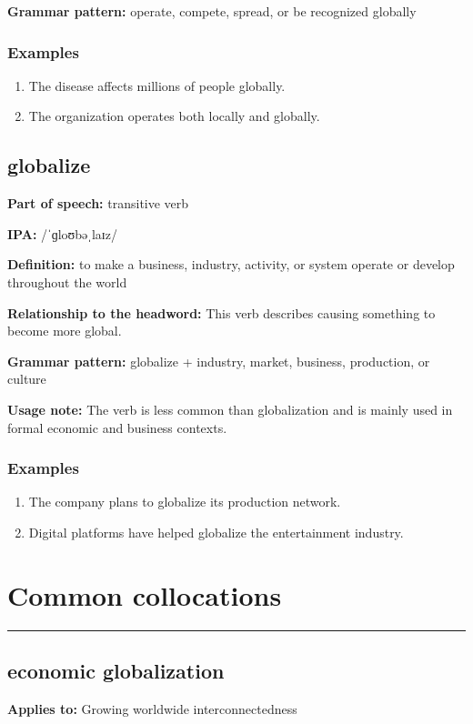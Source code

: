 \documentclass[11pt]{article}
\newcommand{\sectionrule}{\par\vspace{-0.5em}\noindent\textcolor{Accent}{\rule{\linewidth}{0.6pt}}\par}
\begin{document}
\textbf{Grammar pattern:} operate, compete, spread, or be recognized globally

\subsubsection{Examples}
\begin{enumerate}
  \item The disease affects millions of people globally.
  \item The organization operates both locally and globally.
\end{enumerate}

\subsection{globalize}
\textbf{Part of speech:} transitive verb

\textbf{IPA:} /ˈɡloʊbəˌlaɪz/

\textbf{Definition:} to make a business, industry, activity, or system operate or develop throughout the world

\textbf{Relationship to the headword:} This verb describes causing something to become more global.

\textbf{Grammar pattern:} globalize + industry, market, business, production, or culture

\textbf{Usage note:} The verb is less common than globalization and is mainly used in formal economic and business contexts.

\subsubsection{Examples}
\begin{enumerate}
  \item The company plans to globalize its production network.
  \item Digital platforms have helped globalize the entertainment industry.
\end{enumerate}

\section{Common collocations}
\sectionrule
\subsection{economic globalization}
\textbf{Applies to:} Growing worldwide interconnectedness
\end{document}
